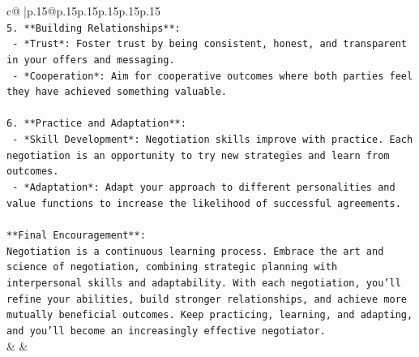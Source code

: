 \documentclass{article}
\begin{document}
{\begin{supertabular}{c@{$\;$}|p{.15\linewidth}@{}p{.15\linewidth}p{.15\linewidth}p{.15\linewidth}p{.15\linewidth}p{.15\linewidth}}
{{{\\ 
\texttt{5. **Building Relationships**:} \\
\texttt{   {-} *Trust*: Foster trust by being consistent, honest, and transparent in your offers and messaging.} \\
\texttt{   {-} *Cooperation*: Aim for cooperative outcomes where both parties feel they have achieved something valuable.} \\
\\ 
\texttt{6. **Practice and Adaptation**:} \\
\texttt{   {-} *Skill Development*: Negotiation skills improve with practice. Each negotiation is an opportunity to try new strategies and learn from outcomes.} \\
\texttt{   {-} *Adaptation*: Adapt your approach to different personalities and value functions to increase the likelihood of successful agreements.} \\
\\ 
\texttt{**Final Encouragement**:} \\
\texttt{Negotiation is a continuous learning process. Embrace the art and science of negotiation, combining strategic planning with interpersonal skills and adaptability. With each negotiation, you'll refine your abilities, build stronger relationships, and achieve more mutually beneficial outcomes. Keep practicing, learning, and adapting, and you'll become an increasingly effective negotiator.} \\
            }
        }
    }
    & & \\ \\


\end{supertabular}}
\end{document}
